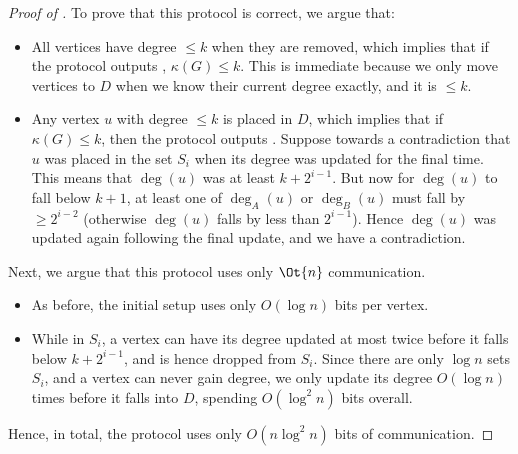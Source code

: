 \begin{proof}[Proof of ]
To prove that this protocol is correct, we argue that:
\begin{itemize}
  \item All vertices have degree $\leq k$ when they are removed, which
    implies that if the protocol outputs \true{}, $\kappa(G) \leq k$.
    This is immediate because we only move vertices to $D$ when we know their
    current degree exactly, and it is $\leq k$.
  \item Any vertex $u$ with degree $\leq k$ is placed in $D$, which implies
    that if $\kappa(G) \leq k$, then the protocol outputs \true{}.
    Suppose towards a contradiction that $u$ was placed in the set $S_i$ when
    its degree was updated for the final time.
    This means that $\deg(u)$ was at least $k + 2^{i - 1}$.
    But now for $\deg(u)$ to fall below $k + 1$, at least one of $\deg_A(u)$
    or $\deg_B(u)$ must fall by $\geq 2^{i - 2}$ (otherwise $\deg(u)$ falls by
    less than $2^{i - 1}$).
    Hence $\deg(u)$ was updated again following the final update, and we have
    a contradiction.
\end{itemize}

Next, we argue that this protocol uses only $\Ot{n}$ communication.
\begin{itemize}
  \item As before, the initial setup uses only $O(\log n)$ bits per vertex.
  \item While in $S_i$, a vertex can have its degree updated at most twice
    before it falls below $k + 2^{i - 1}$, and is hence dropped from
    $S_i$.
    Since there are only $\log n$ sets $S_i$, and a vertex can never gain
    degree, we only update its degree $O(\log n)$ times before it falls into $D$,
    spending $O( \log^2 n )$ bits overall.
\end{itemize}
Hence, in total, the protocol uses only $O(n \log^2 n)$ bits of communication.
\end{proof}
